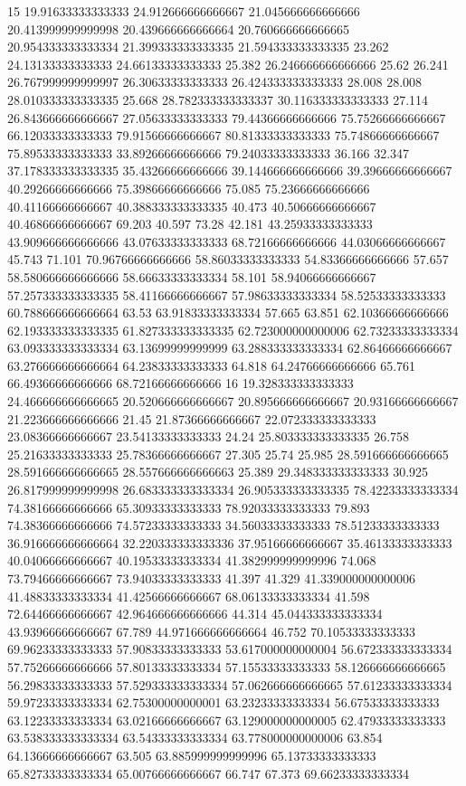 15 19.91633333333333 24.912666666666667 21.045666666666666 20.413999999999998 20.439666666666664 20.760666666666665 20.954333333333334 21.399333333333335 21.594333333333335 23.262 24.13133333333333 24.66133333333333 25.382 26.246666666666666 25.62 26.241 26.767999999999997 26.30633333333333 26.424333333333333 28.008 28.008 28.010333333333335 25.668 28.782333333333337 30.116333333333333 27.114 26.843666666666667 27.05633333333333 79.44366666666666 75.75266666666667 66.12033333333333 79.91566666666667 80.81333333333333 75.74866666666667 75.89533333333333 33.89266666666666 79.24033333333333 36.166 32.347 37.178333333333335 35.43266666666666 39.144666666666666 39.39666666666667 40.29266666666666 75.39866666666666 75.085 75.23666666666666 40.41166666666667 40.388333333333335 40.473 40.50666666666667 40.46866666666667 69.203 40.597 73.28 42.181 43.25933333333333 43.909666666666666 43.07633333333333 68.72166666666666 44.03066666666667 45.743 71.101 70.96766666666666 58.86033333333333 54.83366666666666 57.657 58.580666666666666 58.66633333333334 58.101 58.94066666666667 57.257333333333335 58.41166666666667 57.98633333333334 58.52533333333333 60.788666666666664 63.53 63.91833333333334 57.665 63.851 62.10366666666666 62.193333333333335 61.827333333333335 62.723000000000006 62.73233333333334 63.093333333333334 63.13699999999999 63.288333333333334 62.86466666666667 63.276666666666664 64.23833333333333 64.818 64.24766666666666 65.761 66.49366666666666 68.72166666666666
16 19.328333333333333 24.466666666666665 20.520666666666667 20.895666666666667 20.93166666666667 21.223666666666666 21.45 21.87366666666667 22.072333333333333 23.08366666666667 23.54133333333333 24.24 25.803333333333335 26.758 25.21633333333333 25.78366666666667 27.305 25.74 25.985 28.591666666666665 28.591666666666665 28.557666666666663 25.389 29.348333333333333 30.925 26.817999999999998 26.683333333333334 26.905333333333335 78.42233333333334 74.38166666666666 65.30933333333333 78.92033333333333 79.893 74.38366666666666 74.57233333333333 34.56033333333333 78.51233333333333 36.916666666666664 32.220333333333336 37.95166666666667 35.46133333333333 40.04066666666667 40.19533333333334 41.382999999999996 74.068 73.79466666666667 73.94033333333333 41.397 41.329 41.339000000000006 41.48833333333334 41.42566666666667 68.06133333333334 41.598 72.64466666666667 42.964666666666666 44.314 45.044333333333334 43.93966666666667 67.789 44.971666666666664 46.752 70.10533333333333 69.96233333333333 57.90833333333333 53.617000000000004 56.672333333333334 57.75266666666666 57.80133333333334 57.15533333333333 58.126666666666665 56.29833333333333 57.529333333333334 57.062666666666665 57.61233333333334 59.97233333333334 62.75300000000001 63.23233333333334 56.67533333333333 63.12233333333334 63.02166666666667 63.129000000000005 62.47933333333333 63.538333333333334 63.54333333333334 63.778000000000006 63.854 64.13666666666667 63.505 63.885999999999996 65.13733333333333 65.82733333333334 65.00766666666667 66.747 67.373 69.66233333333334
